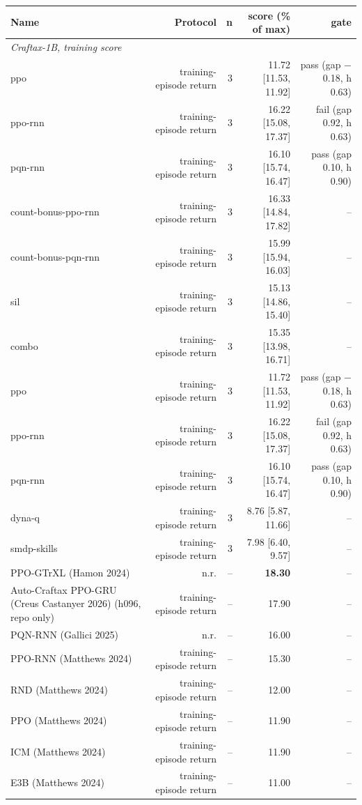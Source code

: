 \begin{tabular}{lrrrr}
\toprule
Name & Protocol & n & score (\% of max) & gate \\
\midrule
\multicolumn{5}{l}{\emph{Craftax-1B, training score}} \\
ppo & training-episode return & 3 & 11.72 [11.53, 11.92] & pass (gap \ensuremath{-}0.18, h 0.63) \\
ppo-rnn & training-episode return & 3 & 16.22 [15.08, 17.37] & fail (gap 0.92, h 0.63) \\
pqn-rnn & training-episode return & 3 & 16.10 [15.74, 16.47] & pass (gap 0.10, h 0.90) \\
count-bonus-ppo-rnn & training-episode return & 3 & 16.33 [14.84, 17.82] & -- \\
count-bonus-pqn-rnn & training-episode return & 3 & 15.99 [15.94, 16.03] & -- \\
sil & training-episode return & 3 & 15.13 [14.86, 15.40] & -- \\
combo & training-episode return & 3 & 15.35 [13.98, 16.71] & -- \\
ppo & training-episode return & 3 & 11.72 [11.53, 11.92] & pass (gap \ensuremath{-}0.18, h 0.63) \\
ppo-rnn & training-episode return & 3 & 16.22 [15.08, 17.37] & fail (gap 0.92, h 0.63) \\
pqn-rnn & training-episode return & 3 & 16.10 [15.74, 16.47] & pass (gap 0.10, h 0.90) \\
dyna-q & training-episode return & 3 & 8.76 [5.87, 11.66] & -- \\
smdp-skills & training-episode return & 3 & 7.98 [6.40, 9.57] & -- \\
PPO-GTrXL (Hamon 2024) & n.r. & -- & \textbf{18.30} & -- \\
Auto-Craftax PPO-GRU (Creus Castanyer 2026) (h096, repo only) & training-episode return & -- & 17.90 & -- \\
PQN-RNN (Gallici 2025) & n.r. & -- & 16.00 & -- \\
PPO-RNN (Matthews 2024) & training-episode return & -- & 15.30 & -- \\
RND (Matthews 2024) & training-episode return & -- & 12.00 & -- \\
PPO (Matthews 2024) & training-episode return & -- & 11.90 & -- \\
ICM (Matthews 2024) & training-episode return & -- & 11.90 & -- \\
E3B (Matthews 2024) & training-episode return & -- & 11.00 & -- \\

\end{tabular}
